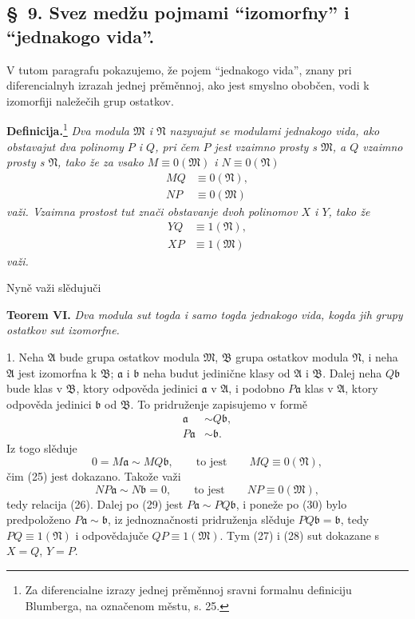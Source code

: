 \documentclass[11pt]{article}
\providecommand{\mM}{\mathfrak M}
\providecommand{\mN}{\mathfrak N}
\providecommand{\mA}{\mathfrak A}
\providecommand{\mB}{\mathfrak B}
\providecommand{\ma}{\mathfrak a}
\providecommand{\mb}{\mathfrak b}
\begin{document}

\setcounter{footnote}{16}
\subsection*{\S~9. Svez medžu pojmami ``izomorfny'' i ``jednakogo vida''.}

V tutom paragrafu pokazujemo, že pojem ``jednakogo vida'', znany pri diferencialnyh izrazah jednej prěměnnoj, ako jest smyslno obobčen, vodi k izomorfiji naležečih grup ostatkov.

\textbf{Definicija.}\footnote{Za diferencialne izrazy jednej prěměnnoj sravni formalnu definiciju Blumberga, na označenom městu, s. 25.} \textit{Dva modula \(\mM\) i \(\mN\) nazyvajut se modulami jednakogo vida, ako obstavajut dva polinomy \(P\) i \(Q\), pri čem \(P\) jest vzaimno prosty s \(\mM\), a \(Q\) vzaimno prosty s \(\mN\), tako že za vsako \(M\equiv0(\mM)\) i \(N\equiv0(\mN)\)}
\begin{align}
 MQ&\equiv0(\mN),\tag{25}\\
 NP&\equiv0(\mM)\tag{26}
\end{align}
\textit{važi. Vzaimna prostost tut znači obstavanje dvoh polinomov \(X\) i \(Y\), tako že}
\begin{align}
 YQ&\equiv1(\mN),\tag{27}\\
 XP&\equiv1(\mM)\tag{28}
\end{align}
\textit{važi.}

Nyně važi slědujuči

\textbf{Teorem VI.} \textit{Dva modula sut togda i samo togda jednakogo vida, kogda jih grupy ostatkov sut izomorfne.}

1. Neha \(\mA\) bude grupa ostatkov modula \(\mM\), \(\mB\) grupa ostatkov modula \(\mN\), i neha \(\mA\) jest izomorfna k \(\mB\); \(\ma\) i \(\mb\) neha budut jedinične klasy od \(\mA\) i \(\mB\). Dalej neha \(Q\mb\) bude klas v \(\mB\), ktory odpověda jedinici \(\ma\) v \(\mA\), i podobno \(P\ma\) klas v \(\mA\), ktory odpověda jedinici \(\mb\) od \(\mB\). To pridruženje zapisujemo v formě
\begin{align}
 \ma&\sim Q\mb,\tag{29}\\
 P\ma&\sim\mb.\tag{30}
\end{align}
Iz togo slěduje
\[
 0=M\ma\sim MQ\mb,
 \qquad\text{to jest}\qquad MQ\equiv0(\mN),
\]
čim (25) jest dokazano. Takože važi
\[
 NP\ma\sim N\mb=0,
 \qquad\text{to jest}\qquad NP\equiv0(\mM),
\]
tedy relacija (26). Dalej po (29) jest \(P\ma\sim PQ\mb\), i poneže po (30) bylo predpoloženo \(P\ma\sim\mb\), iz jednoznačnosti pridruženja slěduje \(PQ\mb=\mb\), tedy \(PQ\equiv1(\mN)\) i odpovědajuče \(QP\equiv1(\mM)\). Tym (27) i (28) sut dokazane s \(X=Q\), \(Y=P\).
\end{document}
